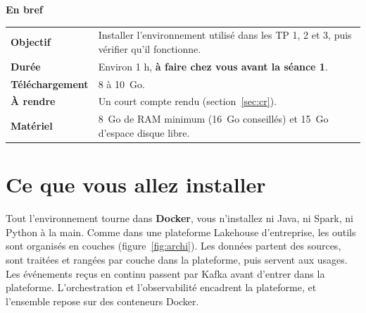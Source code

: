 \documentclass[11pt,a4paper]{article}
\begin{document}

\thispagestyle{empty}
\vspace*{4.2cm}

{\large\bfseries\color{lhblue}En bref}\par\smallskip
\begin{tabularx}{\linewidth}{@{}>{\bfseries}l X@{}}
\toprule
Objectif & Installer l'environnement utilisé dans les TP 1, 2 et 3, puis vérifier qu'il fonctionne. \\
Durée    & Environ 1 h, \textbf{à faire chez vous avant la séance 1}. \\
Téléchargement & 8 à 10~Go. \\
À rendre & Un court compte rendu (section~\ref{sec:cr}). \\
Matériel & 8~Go de RAM minimum (16~Go conseillés) et 15~Go d'espace disque libre. \\
\bottomrule
\end{tabularx}

\section{Ce que vous allez installer}

Tout l'environnement tourne dans \textbf{Docker}, vous n'installez ni Java, ni Spark, ni Python à la main.
Comme dans une plateforme Lakehouse d'entreprise, les outils sont organisés en couches
(figure~\ref{fig:archi}). Les données partent des sources, sont traitées et rangées par couche
dans la plateforme, puis servent aux usages. Les événements reçus en continu passent par Kafka avant
d'entrer dans la plateforme. L'orchestration et l'observabilité encadrent la plateforme, et
l'ensemble repose sur des conteneurs Docker.
\end{document}
